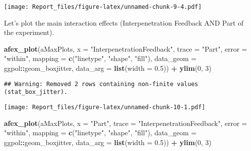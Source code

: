 \documentclass[
]{article}
\newenvironment{Shaded}{\begin{snugshade}}{\end{snugshade}}
\newcommand{\DataTypeTok}[1]{\textcolor[rgb]{0.13,0.29,0.53}{#1}}
\newcommand{\DecValTok}[1]{\textcolor[rgb]{0.00,0.00,0.81}{#1}}
\newcommand{\FloatTok}[1]{\textcolor[rgb]{0.00,0.00,0.81}{#1}}
\newcommand{\KeywordTok}[1]{\textcolor[rgb]{0.13,0.29,0.53}{\textbf{#1}}}
\newcommand{\NormalTok}[1]{#1}
\newcommand{\OperatorTok}[1]{\textcolor[rgb]{0.81,0.36,0.00}{\textbf{#1}}}
\newcommand{\StringTok}[1]{\textcolor[rgb]{0.31,0.60,0.02}{#1}}
\begin{document}
\texttt{[image: Report\_files/figure-latex/unnamed-chunk-9-4.pdf]}

Let's plot the main interaction effects (Interpenetration Feedback AND
Part of the experiment).

\begin{Shaded}
\begin{Highlighting}[]
\KeywordTok{afex_plot}\NormalTok{(aMaxPlots, }\DataTypeTok{x =} \StringTok{"InterpenetrationFeedback"}\NormalTok{, }\DataTypeTok{trace =} \StringTok{"Part"}\NormalTok{, }\DataTypeTok{error =} \StringTok{"within"}\NormalTok{, }
                \DataTypeTok{mapping =} \KeywordTok{c}\NormalTok{(}\StringTok{"linetype"}\NormalTok{, }\StringTok{"shape"}\NormalTok{, }\StringTok{"fill"}\NormalTok{),}
                \DataTypeTok{data_geom =}\NormalTok{ ggpol}\OperatorTok{::}\NormalTok{geom_boxjitter, }
                \DataTypeTok{data_arg =} \KeywordTok{list}\NormalTok{(}\DataTypeTok{width =} \FloatTok{0.5}\NormalTok{)) }\OperatorTok{+}
\StringTok{            }\KeywordTok{ylim}\NormalTok{(}\DecValTok{0}\NormalTok{, }\DecValTok{3}\NormalTok{)}
\end{Highlighting}
\end{Shaded}

\begin{verbatim}
## Warning: Removed 2 rows containing non-finite values (stat_box_jitter).
\end{verbatim}

\texttt{[image: Report\_files/figure-latex/unnamed-chunk-10-1.pdf]}

\begin{Shaded}
\begin{Highlighting}[]
\KeywordTok{afex_plot}\NormalTok{(aMaxPlots, }\DataTypeTok{x =} \StringTok{"Part"}\NormalTok{, }\DataTypeTok{trace =} \StringTok{"InterpenetrationFeedback"}\NormalTok{, }\DataTypeTok{error =} \StringTok{"within"}\NormalTok{, }
                \DataTypeTok{mapping =} \KeywordTok{c}\NormalTok{(}\StringTok{"linetype"}\NormalTok{, }\StringTok{"shape"}\NormalTok{, }\StringTok{"fill"}\NormalTok{),}
                \DataTypeTok{data_geom =}\NormalTok{ ggpol}\OperatorTok{::}\NormalTok{geom_boxjitter, }
                \DataTypeTok{data_arg =} \KeywordTok{list}\NormalTok{(}\DataTypeTok{width =} \FloatTok{0.5}\NormalTok{))  }\OperatorTok{+}
\StringTok{            }\KeywordTok{ylim}\NormalTok{(}\DecValTok{0}\NormalTok{, }\DecValTok{3}\NormalTok{)}
\end{Highlighting}
\end{Shaded}
\end{document}
